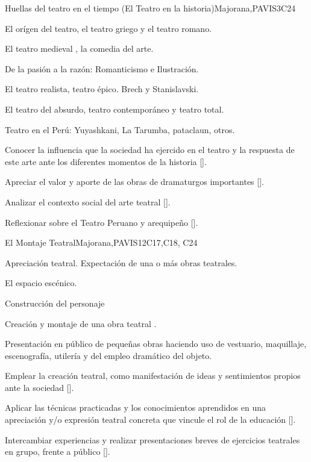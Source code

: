 \begin{syllabus}
\begin{unit}{}{Huellas del teatro en el tiempo  (El Teatro en la historia)}{Majorana,PAVIS}{3}{C24}
\begin{topics}
	\item El orígen del teatro, el teatro griego y el teatro romano.
	\item El teatro medieval , la comedia del arte.
	\item De la pasión a la razón: Romanticismo e Ilustración.
	\item El teatro realista, teatro épico. Brech  y  Stanislavski.
	\item El teatro del absurdo, teatro contemporáneo y teatro total.
	\item Teatro en el Perú: Yuyashkani, La Tarumba, pataclaun, otros.
\end{topics}
\begin{learningoutcomes}
	\item Conocer la influencia que la sociedad ha ejercido en el teatro y la respuesta de este arte ante los diferentes momentos de la historia [\Usage].
	\item Apreciar el valor y aporte de las obras de dramaturgos importantes [\Usage].
	\item Analizar el contexto social del arte teatral [\Usage].
	\item Reflexionar sobre el Teatro Peruano y arequipeño [\Usage].
\end{learningoutcomes}
\end{unit}

\begin{unit}{}{El  Montaje Teatral}{Majorana,PAVIS}{12}{C17,C18, C24}
\begin{topics}
	\item Apreciación teatral. Expectación de una o más obras teatrales.
	\item El espacio escénico.
	\item Construcción del personaje
	\item Creación y montaje de una obra teatral .
	\item Presentación en público de pequeñas obras haciendo uso de vestuario, maquillaje, escenografía, utilería y del empleo dramático del objeto.
\end{topics}
\begin{learningoutcomes}
	\item Emplear  la creación teatral, como manifestación de ideas y sentimientos propios ante la sociedad [\Usage].
	\item Aplicar las técnicas practicadas y los conocimientos aprendidos en una apreciación y/o expresión teatral concreta que vincule el rol de la educación [\Usage].
	\item Intercambiar experiencias y realizar presentaciones breves de ejercicios teatrales en grupo, frente a público [\Usage].
\end{learningoutcomes}
\end{unit}

\begin{coursebibliography}
\end{coursebibliography}

\end{syllabus}
